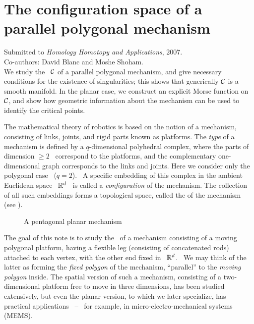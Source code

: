 \chapter{The configuration space of a parallel polygonal mechanism}
\label{chap3}

\textsf{Submitted to \textsl{Homology Homotopy and Applications}, 2007.}\\
\textsf{Co-authors: David Blanc and Moshe Shoham.}\\

 We study the  \cspace\ $\mathcal{C}$ of a parallel polygonal
mechanism, and give necessary conditions for the existence of
singularities; this shows that generically $\mathcal{C}$ is a smooth
manifold. In the planar case, we construct an explicit Morse
function on $\mathcal{C}$, and show how geometric information about the
mechanism can be used to identify the critical points.

%
%
 \label{cint}

The mathematical theory of robotics is based on the notion of a
mechanism, consisting of links, joints, and rigid parts known
as platforms.  The \emph{type} of a mechanism is defined by a
$q$-dimensional polyhedral complex, where the parts of dimension
$\geq 2$ \ correspond to the platforms, and the complementary
one-dimensional graph corresponds to the links and joints.
Here we consider only the polygonal case  \ ($q=2$). \
A specific embedding of this complex in the ambient Euclidean space  \
${\mathbb R}^{d}$ \ is called a \emph{configuration} of the mechanism. The
collection of all such embeddings forms a topological space, called the
\emph{\cspace} of the mechanism (see \cite{Ha}).

\begin{figure}[htb]
\begin{center}
\epsfysize=4cm %
\leavevmode {} \caption{A
pentagonal planar mechanism} \label{fig:kgon}
\end{center}
\end{figure}

The goal of this note is to study the \cspace\ of a mechanism
consisting of a moving polygonal platform, having a
flexible leg (consisting of concatenated rods) attached to each
vertex, with the other end fixed in  \ ${\mathbb R}^{d}$. \ We may think of the
latter as forming the \emph{fixed polygon} of the mechanism, ``parallel''
to the \emph{moving polygon} inside.
The spatial version of such a mechanism, consisting of a
two-dimensional platform free to move in three dimensions, has been
studied extensively, but even the planar version, to which we
later specialize, has practical applications \ -- \ for example, in
micro-electro-mechanical systems (MEMS)\vs.

